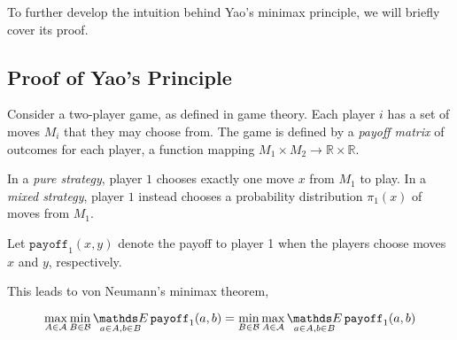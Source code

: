 To further develop the intuition behind Yao's minimax principle, we will briefly cover its proof.

\subsection{Proof of Yao's Principle}

Consider a two-player game, as defined in game theory. Each player $i$ has a set of moves $M_i$ that they may choose from. The game is defined by a \emph{payoff matrix} of outcomes for each player, a function mapping $M_1 \times M_2 \rightarrow \mathds{R} \times \mathds{R}$.

In a \emph{pure strategy}, player $1$ chooses exactly one move $x$ from $M_1$ to play. In a \emph{mixed strategy}, player $1$ instead chooses a probability distribution $\pi_1(x)$ of moves from $M_1$.

Let $\texttt{payoff}_1(x, y)$ denote the payoff to player 1 when the players choose moves $x$ and $y$, respectively.






This leads to von Neumann's minimax theorem,

$$\max_{A \in \mathcal{A}} \min_{B \in \mathcal{B}} \Expected_{a \in A, b \in B} \texttt{payoff}_1(a, b) = \min_{B \in \mathcal{B}} \max_{A \in \mathcal{A}} \Expected_{a \in A, b \in B} \texttt{payoff}_1(a, b)$$


